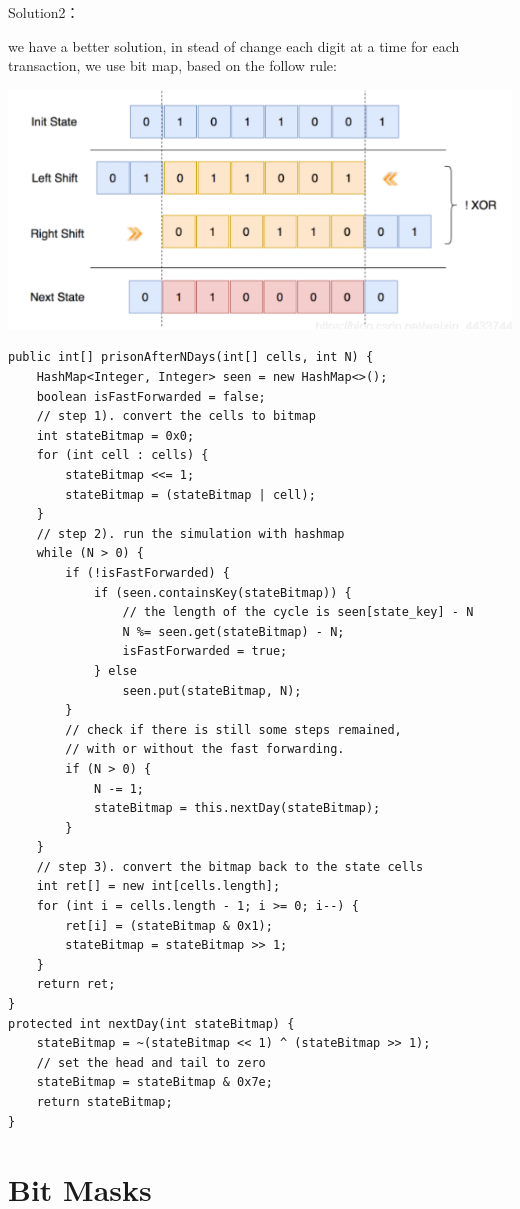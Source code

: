 \documentclass[9pt, b5paaper]{book}
\begin{document}
Solution2：

we have a better solution, in stead of change each digit at a time for each transaction, we use bit map, based on the follow rule:

\includegraphics[width=.9\linewidth]{./pic/prisonCell.png}

\begin{verbatim}
public int[] prisonAfterNDays(int[] cells, int N) {
    HashMap<Integer, Integer> seen = new HashMap<>();
    boolean isFastForwarded = false;
    // step 1). convert the cells to bitmap
    int stateBitmap = 0x0;
    for (int cell : cells) {
        stateBitmap <<= 1;
        stateBitmap = (stateBitmap | cell);
    }
    // step 2). run the simulation with hashmap
    while (N > 0) {
        if (!isFastForwarded) {
            if (seen.containsKey(stateBitmap)) {
                // the length of the cycle is seen[state_key] - N
                N %= seen.get(stateBitmap) - N;
                isFastForwarded = true;
            } else
                seen.put(stateBitmap, N);
        }
        // check if there is still some steps remained,
        // with or without the fast forwarding.
        if (N > 0) {
            N -= 1;
            stateBitmap = this.nextDay(stateBitmap);
        }
    }
    // step 3). convert the bitmap back to the state cells
    int ret[] = new int[cells.length];
    for (int i = cells.length - 1; i >= 0; i--) {
        ret[i] = (stateBitmap & 0x1);
        stateBitmap = stateBitmap >> 1;
    }
    return ret;
}
protected int nextDay(int stateBitmap) {
    stateBitmap = ~(stateBitmap << 1) ^ (stateBitmap >> 1);
    // set the head and tail to zero
    stateBitmap = stateBitmap & 0x7e;
    return stateBitmap;
}
\end{verbatim}

\chapter{Bit Masks}
\label{sec-11}
\end{document}
